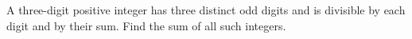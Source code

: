 A three-digit positive integer has three distinct odd digits and is divisible by each digit and by their sum. Find the sum of all such integers.
